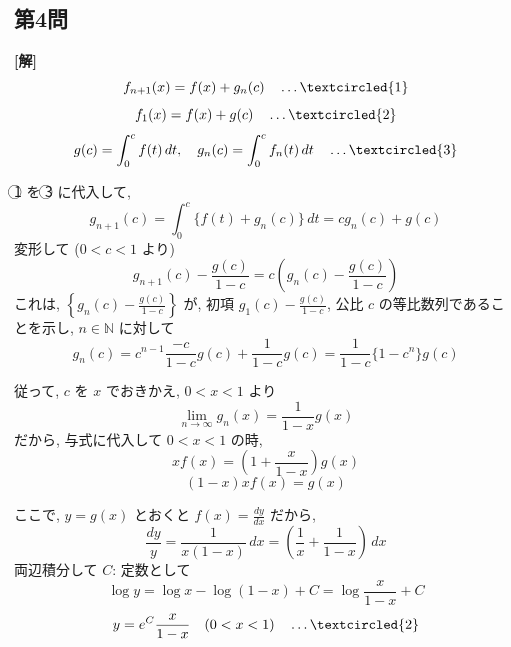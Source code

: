 \documentclass[../main.tex]{subfiles}
\begin{document}
\begin{center}
\end{center}

\newpage

\subsection*{第4問}

\noindent
\textbf{[解]}
\[
  f_{n+1}(x) = f(x) + g_n(c) \quad \dots \textcircled{1}
\]
\[
  f_1(x) = f(x) + g(c) \quad \dots \textcircled{2}
\]
\[
  g(c) = \int_0^c f(t) \, dt, \quad g_n(c) = \int_0^c f_n(t) \, dt \quad \dots \textcircled{3}
\]

\noindent
\textcircled{1} を \textcircled{3} に代入して,
\[
  g_{n+1}(c) = \int_0^c \{ f(t) + g_n(c) \} \, dt = c g_n(c) + g(c)
\]
変形して ($0 < c < 1$ より)
\[
  g_{n+1}(c) - \frac{g(c)}{1-c} = c \left( g_n(c) - \frac{g(c)}{1-c} \right)
\]
これは, $\left\{ g_n(c) - \frac{g(c)}{1-c} \right\}$ が, 初項 $g_1(c) - \frac{g(c)}{1-c}$, 公比 $c$ の等比数列であることを示し, $n \in \mathbb{N}$ に対して
\[
  g_n(c) = c^{n-1} \frac{-c}{1-c} g(c) + \frac{1}{1-c} g(c) = \frac{1}{1-c} \{ 1 - c^n \} g(c)
\]

\noindent
従って, $c$ を $x$ でおきかえ, $0 < x < 1$ より
\[
  \lim_{n \to \infty} g_n(x) = \frac{1}{1-x} g(x)
\]
だから, 与式に代入して $0 < x < 1$ の時,
\[
  x f(x) = \left( 1 + \frac{x}{1-x} \right) g(x)
\]
\[
  (1-x) x f(x) = g(x)
\]

\noindent
ここで, $y = g(x)$ とおくと $f(x) = \frac{dy}{dx}$ だから,
\[
  \frac{dy}{y} = \frac{1}{x(1-x)} \, dx = \left( \frac{1}{x} + \frac{1}{1-x} \right) \, dx
\]
両辺積分して $C$: 定数として
\[
  \log y = \log x - \log(1-x) + C = \log \frac{x}{1-x} + C
\]
\[
  y = e^C \frac{x}{1-x} \quad (0 < x < 1) \quad \dots \textcircled{2}
\]
\end{document}
